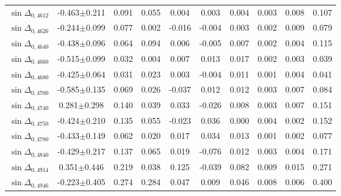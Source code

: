 \begin{table}[H]
{\begin{tabular}{c|c|ccccccc|c}
$\sin\Delta_{0,4612}$ & -0.463$\pm$0.211 & 0.091 & 0.055 & 0.004 & 0.003 & 0.004 & 0.003 & 0.008 & 0.107\\
$\sin\Delta_{0,4626}$ & -0.244$\pm$0.099 & 0.077 & 0.002 & -0.016 & -0.004 & 0.003 & 0.002 & 0.009 & 0.079\\
$\sin\Delta_{0,4640}$ & -0.438$\pm$0.096 & 0.064 & 0.094 & 0.006 & -0.005 & 0.007 & 0.002 & 0.004 & 0.115\\
$\sin\Delta_{0,4660}$ & -0.515$\pm$0.099 & 0.032 & 0.004 & 0.007 & 0.013 & 0.017 & 0.002 & 0.003 & 0.039\\
$\sin\Delta_{0,4680}$ & -0.425$\pm$0.064 & 0.031 & 0.023 & 0.003 & -0.004 & 0.011 & 0.001 & 0.004 & 0.041\\
$\sin\Delta_{0,4700}$ & -0.585$\pm$0.135 & 0.069 & 0.026 & -0.037 & 0.012 & 0.012 & 0.003 & 0.007 & 0.084\\
$\sin\Delta_{0,4740}$ & 0.281$\pm$0.298 & 0.140 & 0.039 & 0.033 & -0.026 & 0.008 & 0.003 & 0.007 & 0.151\\
$\sin\Delta_{0,4750}$ & -0.424$\pm$0.210 & 0.135 & 0.055 & -0.023 & 0.036 & 0.000 & 0.004 & 0.002 & 0.152\\
$\sin\Delta_{0,4780}$ & -0.433$\pm$0.149 & 0.062 & 0.020 & 0.017 & 0.034 & 0.013 & 0.001 & 0.002 & 0.077\\
$\sin\Delta_{0,4840}$ & -0.429$\pm$0.217 & 0.137 & 0.065 & 0.019 & -0.076 & 0.012 & 0.003 & 0.004 & 0.171\\
$\sin\Delta_{0,4914}$ & 0.351$\pm$0.446 & 0.219 & 0.038 & 0.125 & -0.039 & 0.082 & 0.009 & 0.015 & 0.271\\
$\sin\Delta_{0,4946}$ & -0.223$\pm$0.405 & 0.274 & 0.284 & 0.047 & 0.009 & 0.046 & 0.008 & 0.006 & 0.400\\

\hline\hline
\end{tabular}
}
\end{table}

